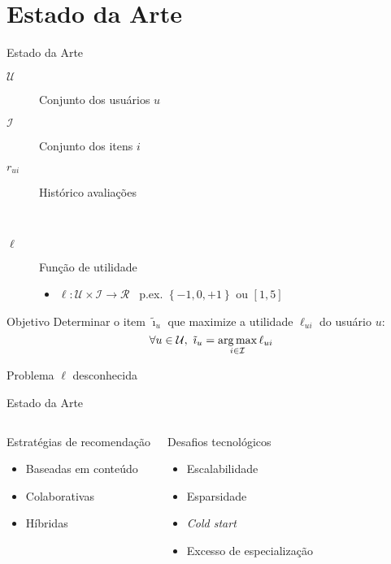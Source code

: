 \section[Estado da Arte]{Estado da Arte}
\begin{frame}{Estado da Arte}
\begin{description}
	\item[$\mathcal{U}$] Conjunto dos usuários $u$ 
	\item[$\mathcal{I}$] Conjunto dos itens $i$ 
	\item[$r_{ui}$] Histórico avaliações \par{~}
	\item[$\ell$] Função de utilidade 
	\begin{itemize}
		\item $\ell: \mathcal{U} \times \mathcal{I} \rightarrow \mathcal{R}$ ~p.ex. $\left\{-1, 0, +1\right\}$ ou $ \left[1, 5\right]$
	\end{itemize}
\end{description}


\begin{block}{Objetivo}
Determinar o item $\tilde{\imath}_u$ que maximize a utilidade $\ell_{ui}$ do usuário $u$:
$$
\forall u \in \mathcal{U}, ~ \tilde{\imath}_u = \operatorname*{arg\,max}_{i \in \mathcal{I}}{\ell_{ui}}
$$
\end{block}

\begin{alertblock}{Problema}
$\ell$ desconhecida
\end{alertblock}
\end{frame}




\begin{frame}{Estado da Arte}
\begin{columns}[c]
\begin{block}{Estratégias de recomendação}
\begin{itemize}
	\item Baseadas em conteúdo
	\item Colaborativas
	\item Híbridas
\end{itemize}
\end{block}

\begin{block}{Desafios tecnológicos}
\begin{itemize}
	\item Escalabilidade
	\item Esparsidade
	\item \textit{Cold start}
	\item Excesso de especialização
\end{itemize}
\end{block}
\end{columns}
\end{frame}



